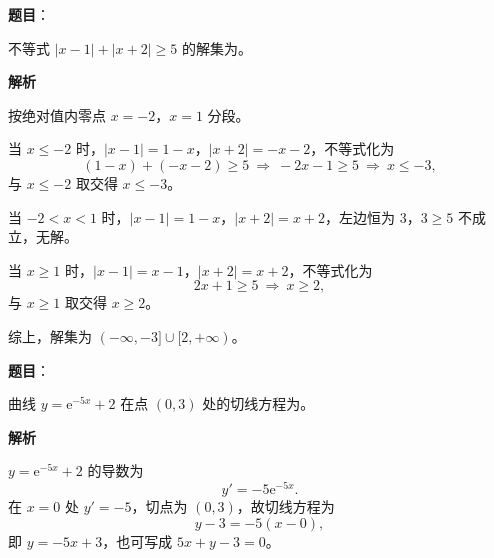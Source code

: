 \begin{answer}

\textbf{题目}：

不等式 $|x-1|+|x+2|\geqslant 5$ 的解集为\gkblank{}。

\textbf{解析}

按绝对值内零点 $x=-2$，$x=1$ 分段。

当 $x\leqslant -2$ 时，$|x-1|=1-x$，$|x+2|=-x-2$，不等式化为
\nopagebreak[4]
\[(1-x)+(-x-2)\geqslant 5\ \Longrightarrow\ -2x-1\geqslant 5\ \Longrightarrow\ x\leqslant -3,\]
与 $x\leqslant -2$ 取交得 $x\leqslant -3$。

当 $-2<x<1$ 时，$|x-1|=1-x$，$|x+2|=x+2$，左边恒为 $3$，$3\geqslant 5$ 不成立，无解。

当 $x\geqslant 1$ 时，$|x-1|=x-1$，$|x+2|=x+2$，不等式化为
\nopagebreak[4]
\[2x+1\geqslant 5\ \Longrightarrow\ x\geqslant 2,\]
与 $x\geqslant 1$ 取交得 $x\geqslant 2$。

综上，解集为 $(-\infty,-3]\cup[2,+\infty)$。

\gkanswer{答案：$(-\infty,-3]\cup[2,+\infty)$。按 $x\leqslant-2$、$-2<x<1$、$x\geqslant1$ 分段去绝对值，分别得 $x\leqslant-3$、无解、$x\geqslant2$。}

\end{answer}
\begin{answer}

\textbf{题目}：

曲线 $y=\mathrm e^{-5x}+2$ 在点 $(0,3)$ 处的切线方程为\gkblank{}。

\textbf{解析}

$y=\mathrm e^{-5x}+2$ 的导数为
\nopagebreak[4]
\[y'=-5\mathrm e^{-5x}.\]
在 $x=0$ 处 $y'=-5$，切点为 $(0,3)$，故切线方程为
\nopagebreak[4]
\[y-3=-5(x-0),\]
即 $y=-5x+3$，也可写成 $5x+y-3=0$。


\end{answer}
